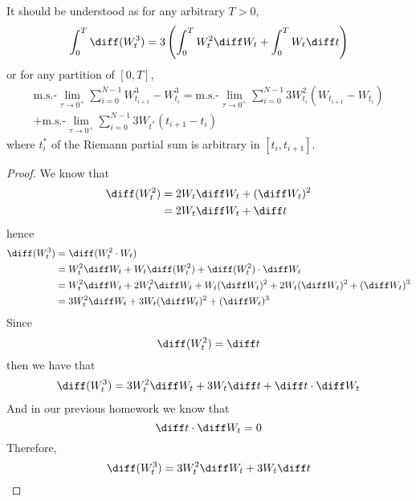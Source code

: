     \problem
    \begin{subproblem}[(\arabic*).]
        \item
        It should be understood as for any arbitrary $T>0$,
        \[\int_0^T\diff(W_t^3)=3\left(\int_0^TW_t^2\diff W_t
        +\int_0^TW_t\diff t\right)\] 
        or for any partition of $[0,T]$,
        \begin{multline*}
            \text{m.s.-}\lim_{\tau\to 0^+}
        \sum_{i=0}^{N-1}
        W_{t_{i+1}}^3-W^3_{t_i}
        =\text{m.s.-}\lim_{\tau\to 0^+}
        \sum_{i=0}^{N-1}
        3W_{t_i}^2(W_{t_{i+1}}-W_{t_i})\\
        +\text{m.s.-}\lim_{\tau\to0^+}
        \sum_{i=0}^{N-1}3W_{t^*}(t_{i+1}-t_i)
        \end{multline*}
        where $t^*_i$ of the Riemann partial sum is arbitrary
        in $[t_i,t_{i+1}]$.

        \item
        \begin{proof}
            We know that
            \[\begin{aligned}
                \diff (W_t^2)&=2W_t\diff W_t+(\diff W_t)^2\\
                &=2W_t\diff W_t+\diff t
            \end{aligned}\]
            hence
            \[\begin{aligned}
                \diff(W_t^3)&=\diff(W_t^2\cdot W_t)\\
                &=W_t^2\diff W_t+W_t\diff(W_t^2)+\diff(W_t^2)\cdot\diff W_t\\
                &=W_t^2\diff W_t
                +2W_t^2\diff W_t+W_t(\diff W_t)^2
                +2W_t(\diff W_t)^2+(\diff W_t)^3\\
                &=3W_t^2\diff W_t+3W_t(\diff W_t)^2+(\diff W_t)^3
            \end{aligned}\]
            Since
            \[\diff(W^2_t)=\diff t\]
            then we have that
            \[\begin{aligned}
                \diff(W_t^3)=3W_t^2\diff W_t+3W_t\diff t+\diff t\cdot\diff W_t
            \end{aligned}\]
            And in our previous homework we know that
            \[\diff t\cdot\diff W_t=0\]
            Therefore,
            \[\diff(W_t^3)=3W_t^2\diff W_t+3W_t\diff t\]
            \end{proof}
    \end{subproblem}

